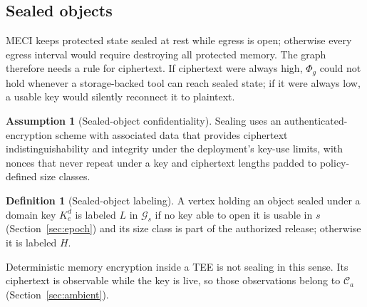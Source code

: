 \documentclass[11pt,letterpaper]{article}
\theoremstyle{plain}
\theoremstyle{definition}
\newtheorem{definition}{Definition}
\newtheorem{assumption}{Assumption}
\newcommand{\Ca}{\mathcal{C}_a}
\newcommand{\Gs}{\mathcal{G}}
\begin{document}
\subsection{Sealed objects}
MECI keeps protected state sealed at rest while egress is open; otherwise every egress interval would require destroying all protected memory. The graph therefore needs a rule for ciphertext. If ciphertext were always high, $\Phi_g$ could not hold whenever a storage-backed tool can reach sealed state; if it were always low, a usable key would silently reconnect it to plaintext.

\begin{assumption}[Sealed-object confidentiality]\label{as:aead}
Sealing uses an authenticated-encryption scheme with associated data \cite{rogaway2002} that provides ciphertext indistinguishability and integrity under the deployment's key-use limits, with nonces that never repeat under a key and ciphertext lengths padded to policy-defined size classes.
\end{assumption}

\begin{definition}[Sealed-object labeling]\label{def:seal}
A vertex holding an object sealed under a domain key $K^{d}_{e}$ is labeled $L$ in $\Gs_s$ if no key able to open it is usable in $s$ (Section~\ref{sec:epoch}) and its size class is part of the authorized release; otherwise it is labeled $H$.
\end{definition}

Deterministic memory encryption inside a TEE is not sealing in this sense. Its ciphertext is observable while the key is live, so those observations belong to $\Ca$ (Section~\ref{sec:ambient}).
\end{document}
